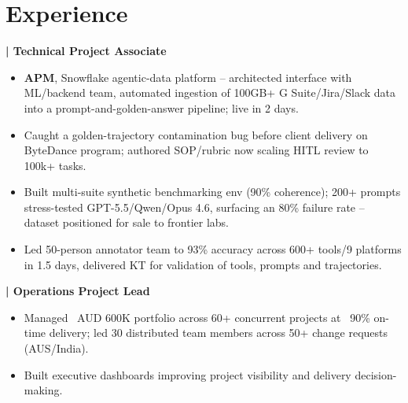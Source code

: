 \documentclass[letterpaper]{deedy-resume} %
\newenvironment{tightitemizebold}{%
  \begin{itemize}\setlength{\itemsep}{0pt}\setlength{\parskip}{0pt}\setlength{\parsep}{0pt}\setlength{\topsep}{0pt}\bfseries
}{%
  \end{itemize}
}
\newcommand{\descriptbold}[1]{%
\color{subheadings}\raggedright\fontspec[Path = fonts/lato/]{Lato-Bol}\fontsize{11pt}{13pt}\selectfont\bfseries {#1 \\} \normalfont}
\begin{document}
\hspace{0.03\textwidth}
%
%
\begin{minipage}[t]{0.63\textwidth} %


\section{Experience}
 \descriptbold{| Technical Project Associate}
\sectionspace
\begin{tightitemizebold}
\item \textbf{APM}, Snowflake agentic-data platform -- architected interface with ML/backend team, automated ingestion of 100GB+ G Suite/Jira/Slack data into a prompt-and-golden-answer pipeline; live in 2 days.
\item Caught a golden-trajectory contamination bug before client delivery on ByteDance program; authored SOP/rubric now scaling HITL review to 100k+ tasks.
\item Built multi-suite synthetic benchmarking env (90\% coherence); 200+ prompts stress-tested GPT-5.5/Qwen/Opus 4.6, surfacing an 80\% failure rate -- dataset positioned for sale to frontier labs.
\item Led 50-person annotator team to 93\% accuracy across 600+ tools/9 platforms in 1.5 days, delivered KT for validation of tools, prompts and trajectories.
\end{tightitemizebold}

\sectionspace 

 \descriptbold{| Operations Project Lead}
\sectionspace
\begin{tightitemizebold}
\item Managed ~AUD 600K portfolio across 60+ concurrent projects at ~90\% on-time delivery; led 30 distributed team members across 50+ change requests (AUS/India).
\item Built executive dashboards improving project visibility and delivery decision-making.
\end{tightitemizebold}


\end{minipage}
\end{document}
